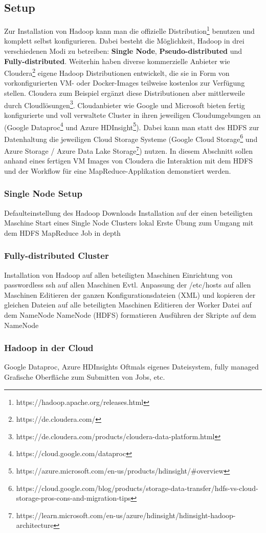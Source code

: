 \subsection{Setup}
Zur Installation von Hadoop kann man die offizielle Distribution\footnote{https://hadoop.apache.org/releases.html} benutzen und komplett selbst konfigurieren. Dabei besteht die Möglichkeit, Hadoop in drei verschiedenen Modi zu betreiben: \textbf{Single Node}, \textbf{Pseudo-distributed} und \textbf{Fully-distributed}. 
Weiterhin haben diverse kommerzielle Anbieter wie Cloudera\footnote{https://de.cloudera.com/} eigene Hadoop Distributionen entwickelt, die sie in Form von vorkonfigurierten VM- oder Docker-Images teilweise kostenlos zur Verfügung stellen. Cloudera zum Beispiel ergänzt diese Distributionen aber mittlerweile durch Cloudlösungen\footnote{https://de.cloudera.com/products/cloudera-data-platform.html}.   
Cloudanbieter wie Google und Microsoft bieten fertig konfigurierte und voll verwaltete Cluster in ihren jeweiligen Cloudumgebungen an (Google Dataproc\footnote{https://cloud.google.com/dataproc} und Azure HDInsight\footnote{https://azure.microsoft.com/en-us/products/hdinsight/\#overview}). Dabei kann man statt des HDFS zur Datenhaltung die jeweiligen Cloud Storage Systeme (Google Cloud Storage\footnote{https://cloud.google.com/blog/products/storage-data-transfer/hdfs-vs-cloud-storage-pros-cons-and-migration-tips} und Azure Storage / Azure Data Lake Storage\footnote{https://learn.microsoft.com/en-us/azure/hdinsight/hdinsight-hadoop-architecture}) nutzen.
In diesem Abschnitt sollen anhand eines fertigen VM Images von Cloudera die Interaktion mit dem HDFS und der Workflow für eine MapReduce-Applikation demonstiert werden. 
\subsubsection*{Single Node Setup}
Defaulteinstellung des Hadoop Downloads
Installation auf der einen beteiligten Maschine
Start eines Single Node Clusters lokal
\label{chap:fund sec:core sub:setup hdfs}
Erste Übung zum Umgang mit dem HDFS
\label{chap:fund sec:core sub:setup mapred}
MapReduce Job in depth
\subsubsection*{Fully-distributed Cluster}
Installation von Hadoop auf allen beteiligten Maschinen
Einrichtung von passwordless ssh auf allen Maschinen
Evtl. Anpassung der /etc/hosts auf allen Maschinen
Editieren der ganzen Konfigurationsdateien (XML) und kopieren der gleichen Dateien auf alle beteiligten Maschinen
Editieren der Worker Datei auf dem NameNode
NameNode (HDFS) formatieren
Ausführen der Skripte auf dem NameNode

\subsubsection*{Hadoop in der Cloud}
Google Dataproc, Azure HDInsights
Oftmals eigenes Dateisystem, fully managed
Grafische Oberfläche zum Submitten von Jobs, etc.



